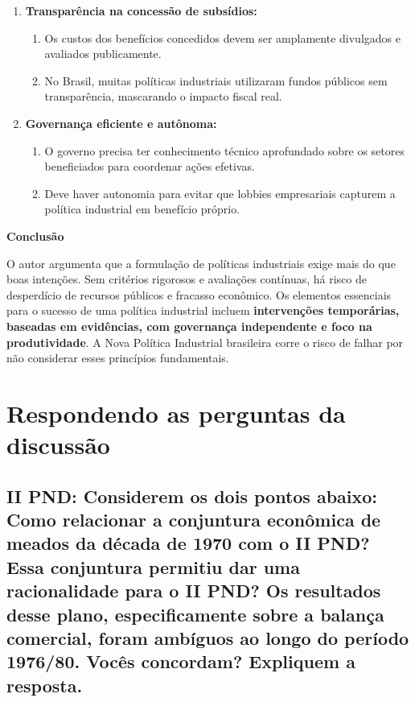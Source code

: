 \documentclass[a4paper,12pt]{article}[abntex2]
\begin{document}
\begin{enumerate}
    \item \textbf{Transparência na concessão de subsídios:}  
    \begin{enumerate}
        \item Os custos dos benefícios concedidos devem ser amplamente divulgados e avaliados publicamente.
        \item No Brasil, muitas políticas industriais utilizaram fundos públicos sem transparência, mascarando o impacto fiscal real.
    \end{enumerate}

    \item \textbf{Governança eficiente e autônoma:}  
    \begin{enumerate}
        \item O governo precisa ter conhecimento técnico aprofundado sobre os setores beneficiados para coordenar ações efetivas.
        \item Deve haver autonomia para evitar que lobbies empresariais capturem a política industrial em benefício próprio.
    \end{enumerate}
\end{enumerate}

\textbf{Conclusão}

O autor argumenta que a formulação de políticas industriais exige mais do que boas intenções. Sem critérios rigorosos e avaliações contínuas, há risco de desperdício de recursos públicos e fracasso econômico. Os elementos essenciais para o sucesso de uma política industrial incluem \textbf{intervenções temporárias, baseadas em evidências, com governança independente e foco na produtividade}. A Nova Política Industrial brasileira corre o risco de falhar por não considerar esses princípios fundamentais.

\newpage
\section{\textbf{Respondendo as perguntas da discussão}}
\subsection{\textbf{II PND: Considerem os dois pontos abaixo: Como relacionar a conjuntura econômica de meados da década de 1970 com o II PND? Essa conjuntura permitiu dar uma racionalidade para o II PND? Os resultados desse plano, especificamente sobre a balança comercial, foram ambíguos ao longo do período 1976/80. Vocês concordam? Expliquem a resposta.}}
\end{document}
